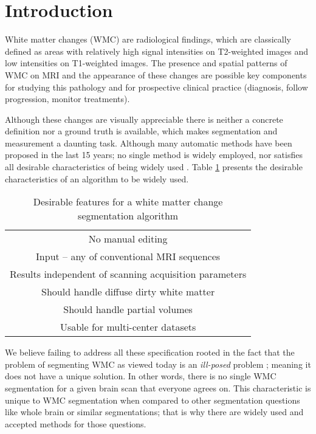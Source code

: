 \section{Introduction} \label{intro}


White matter changes (WMC) are radiological findings, which are classically defined as areas with relatively high signal intensities on T2-weighted images and low intensities on T1-weighted images. The presence and spatial patterns of WMC on MRI and the appearance of these changes are possible key components for studying this pathology and for prospective clinical practice (diagnosis, follow progression, monitor treatments).

Although these changes are visually appreciable there is neither a concrete definition nor a ground truth is available, which makes segmentation and measurement a daunting task. Although many automatic methods have been proposed in the last 15 years; no single method is widely employed, nor satisfies all desirable characteristics of being widely used \cite{GarciaReview}. Table \ref{Table:Requirements} presents the desirable characteristics of an algorithm to be widely used.

\begin{table}
\centering
    \begin{tabular}  {  c }
    \hline
        No manual editing \\ 
        Input – any of conventional MRI sequences \\ 
        Results independent of scanning acquisition parameters \\ 
        Should handle diffuse dirty white matter \\ 
        Should handle partial volumes \\ 
        Usable for multi-center datasets \\
    \hline
    \end{tabular} 
    \caption{Desirable features for a white matter change segmentation algorithm } 
    \label{Table:Requirements}
\end{table}
    
We believe failing to address all these specification rooted in the fact that the problem of segmenting WMC as viewed today is an \textit{ill-posed} problem \cite{IllPosed}; meaning it does not have a unique solution. In other words, there is no single WMC segmentation for a given brain scan that everyone agrees on. This characteristic is unique to WMC segmentation when compared to other segmentation questions like whole brain or similar segmentations; that is why there are widely used and accepted methods for those questions.

